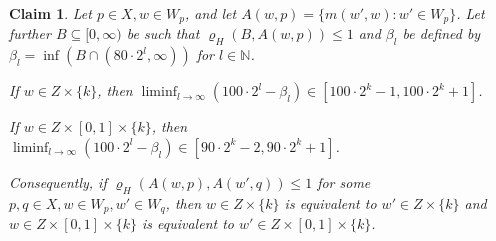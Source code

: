 \documentclass[a4paper]{amsart}
\theoremstyle{plain}
\newtheorem{claim}[theorem]{Claim}
\theoremstyle{remark}
\begin{document}
\begin{claim} \label{cl5}
Let $ p \in X, w \in W_{p} $, and let $ A(w, p) = \{ m(w', w) : w' \in W_{p} \} $. Let further $ B \subseteq [0, \infty) $ be such that $ \varrho_{H}(B, A(w, p)) \leq 1 $ and $ \beta_{l} $ be defined by $ \beta_{l} = \inf (B \cap (80 \cdot 2^{l}, \infty)) $ for $ l \in \mathbb{N} $.

If $ w \in Z \times \{ k \} $, then $ \liminf_{l \to \infty} (100 \cdot 2^{l} - \beta_{l}) \in [100 \cdot 2^{k} - 1, 100 \cdot 2^{k} + 1] $.

If $ w \in Z \times [0, 1] \times \{ k \} $, then $ \liminf_{l \to \infty} (100 \cdot 2^{l} - \beta_{l}) \in [90 \cdot 2^{k} - 2, 90 \cdot 2^{k} + 1] $.

Consequently, if $ \varrho_{H}(A(w, p), A(w', q)) \leq 1 $ for some $ p, q \in X, w \in W_{p}, w' \in W_{q} $, then $ w \in Z \times \{ k \} $ is equivalent to $ w' \in Z \times \{ k \} $ and $ w \in Z \times [0, 1] \times \{ k \} $ is equivalent to $ w' \in Z \times [0, 1] \times \{ k \} $.
\end{claim}
\end{document}
